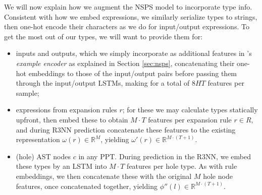 \documentclass{article} %
\begin{document}
We will now explain how we augment the NSPS model to incorporate type info.
%
Consistent with how we embed expressions, we similarly serialize types to strings,
then one-hot encode their characters as we do for input/output expressions.
To get the most out of our types, we will want to provide them for:
\begin{itemize}
    \item inputs and outputs,
    which we simply incorporate as additional features in \citet{nsps}'s
    \emph{example encoder} as explained in Section \ref{sec:nsps},
    concatenating their one-hot embeddings to those of the input/output pairs before passing them through the input/output LSTMs,
    making for a total of $8HT$ features per sample;

    \item expressions from expansion rules $r$; %
    for these we may calculate types statically upfront,
    then embed these to obtain $M \cdot T$ features per expansion rule $r \in R$,
    and during R3NN prediction concatenate these features to the existing
    representation $\omega(r) \in \mathbb{R}^M$,
    yielding $\omega'(r) \in \mathbb{R}^{M \cdot (T+1)}$.

    \item (hole) AST nodes $c$ in any PPT.
    During prediction in the R3NN, we embed these types by an LSTM into $M \cdot T$ features per hole type.
    As with rule embeddings, we then concatenate these with the original $M$ hole node features,
    once concatenated together, yielding $\phi''(l) \in \mathbb{R}^{M \cdot (T+1)}$.

\end{itemize}
\end{document}
